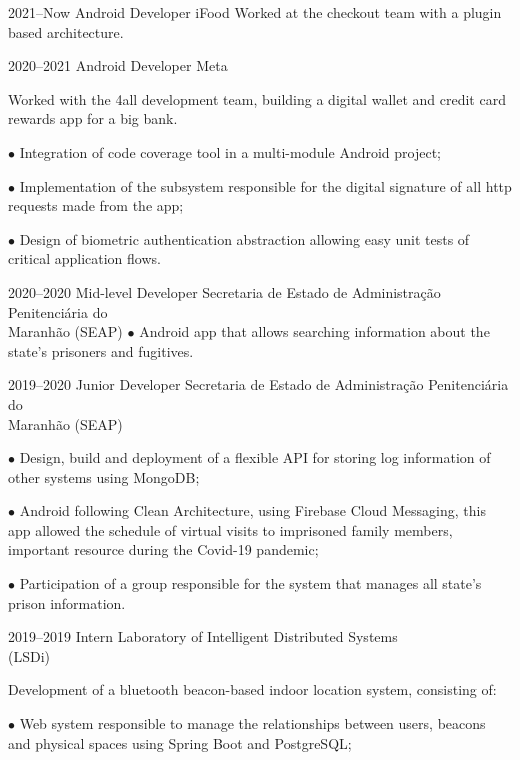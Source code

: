 \documentclass[]{../document-class/twentysecondcv}
\begin{document}
\begin{twenty}
	\twentyitem
		{2021--Now}
		{Android Developer}
		{iFood}
		{
			Worked at the checkout team with a plugin based architecture.
		}

	\twentyitem
		{2020--2021}
		{Android Developer}
		{Meta}
		{
			Worked with the 4all development team, building a digital wallet and credit card rewards app for a big bank. \vskip 4pt

			$\bullet$ Integration of code coverage tool in a multi-module Android project; \vskip 4pt

			$\bullet$ Implementation of the subsystem responsible for the digital signature of all http requests made from the app; \vskip 4pt

			$\bullet$ Design of biometric authentication abstraction allowing easy unit tests of critical application flows.

		}

	\twentyitem
		{2020--2020}
		{Mid-level Developer}
		{Secretaria de Estado de Administração Penitenciária do \\\hspace*{\fill}Maranhão (SEAP)}
		{
			$\bullet$ Android app that allows searching information about the state's prisoners and fugitives.
		}

	\twentyitem
		{2019--2020}
		{Junior Developer}
		{Secretaria de Estado de Administração Penitenciária do \\\hspace*{\fill}Maranhão (SEAP)}
		{
			$\bullet$ Design, build and deployment of a flexible API for storing log information of other systems using MongoDB;\vskip 4pt

			$\bullet$ Android following Clean Architecture, using Firebase Cloud Messaging, this app allowed the schedule of virtual visits to imprisoned family members, important resource during the Covid-19 pandemic;\vskip 4pt

			$\bullet$ Participation of a group responsible for the system that manages all state's prison information.
		}
		
	\twentyitem
		{2019--2019}
		{Intern}
		{Laboratory of Intelligent Distributed Systems \\\hspace*{\fill}(LSDi)}
		{
			Development of a bluetooth beacon-based indoor location system, consisting of:\vskip 4pt

			$\bullet$ Web system responsible to manage the relationships between users, beacons and physical spaces using Spring Boot and PostgreSQL;\vskip 4pt

}
\end{twenty}
\end{document}

